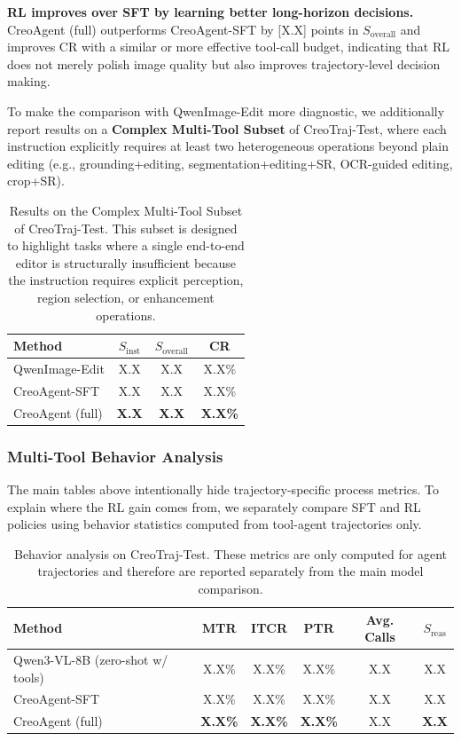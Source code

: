 \documentclass{article}
\begin{document}
\textbf{RL improves over SFT by learning better long-horizon decisions.} CreoAgent (full) outperforms CreoAgent-SFT by [X.X] points in $S_{\text{overall}}$ and improves CR with a similar or more effective tool-call budget, indicating that RL does not merely polish image quality but also improves trajectory-level decision making.

To make the comparison with QwenImage-Edit more diagnostic, we additionally report results on a \textbf{Complex Multi-Tool Subset} of CreoTraj-Test, where each instruction explicitly requires at least two heterogeneous operations beyond plain editing (e.g., grounding+editing, segmentation+editing+SR, OCR-guided editing, crop+SR).

\begin{table}[t]
\centering
\caption{Results on the Complex Multi-Tool Subset of CreoTraj-Test. This subset is designed to highlight tasks where a single end-to-end editor is structurally insufficient because the instruction requires explicit perception, region selection, or enhancement operations.}
\label{tab:complex_subset}
\begin{tabular}{lccc}
\toprule
\textbf{Method} & $S_{\text{inst}}$ & $S_{\text{overall}}$ & CR \\
\midrule
QwenImage-Edit & X.X & X.X & X.X\% \\
CreoAgent-SFT & X.X & X.X & X.X\% \\
CreoAgent (full) & \textbf{X.X} & \textbf{X.X} & \textbf{X.X\%} \\
\bottomrule
\end{tabular}
\end{table}


\subsubsection{Multi-Tool Behavior Analysis}

The main tables above intentionally hide trajectory-specific process metrics. To explain where the RL gain comes from, we separately compare SFT and RL policies using behavior statistics computed from tool-agent trajectories only.

\begin{table}[t]
\centering
\caption{Behavior analysis on CreoTraj-Test. These metrics are only computed for agent trajectories and therefore are reported separately from the main model comparison.}
\label{tab:behavior_analysis}
\begin{tabular}{lccccc}
\toprule
\textbf{Method} & MTR & ITCR & PTR & Avg. Calls & $S_{\text{reas}}$ \\
\midrule
Qwen3-VL-8B (zero-shot w/ tools) & X.X\% & X.X\% & X.X\% & X.X & X.X \\
CreoAgent-SFT & X.X\% & X.X\% & X.X\% & X.X & X.X \\
CreoAgent (full) & \textbf{X.X\%} & \textbf{X.X\%} & \textbf{X.X\%} & X.X & \textbf{X.X} \\
\bottomrule
\end{tabular}
\end{table}
\end{document}
